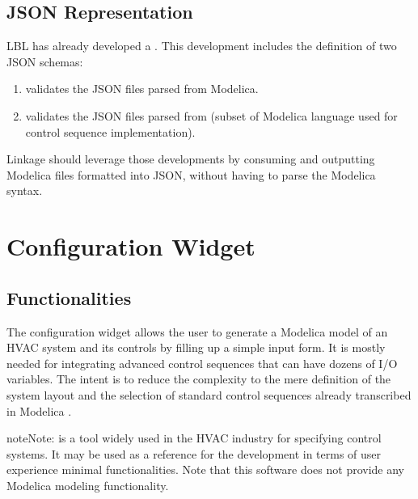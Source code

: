 \documentclass[letterpaper,10pt, openany,english]{sphinxmanual}
\begin{document}
\subsection{JSON Representation}
\label{\detokenize{requirements:json-representation}}
LBL has already developed a .
This development includes the definition of two JSON schemas:
\begin{enumerate}
%
\item {} 
 validates the JSON files parsed from Modelica.

\item {} 
 validates the JSON files parsed from  (subset of Modelica language used for control sequence implementation).

\end{enumerate}

Linkage should leverage those developments by consuming and outputting Modelica files formatted into JSON, without having to parse the Modelica syntax.


\section{Configuration Widget}
\label{\detokenize{requirements:configuration-widget}}\label{\detokenize{requirements:sec-configuration-widget}}

\subsection{Functionalities}
\label{\detokenize{requirements:functionalities}}
The configuration widget allows the user to generate a Modelica model of an HVAC system and its controls by filling up a simple input form.
It is mostly needed for integrating advanced control sequences that can have dozens of I/O variables.
The intent is to reduce the complexity to the mere definition of the system layout and the selection of standard control sequences already transcribed in Modelica .

\begin{sphinxadmonition}{note}{Note:}
 is a tool widely used in the HVAC industry for specifying control systems. It may be used as a reference for the development in terms of user experience minimal functionalities. Note that this software does not provide any Modelica modeling functionality.
\end{sphinxadmonition}
\end{document}
